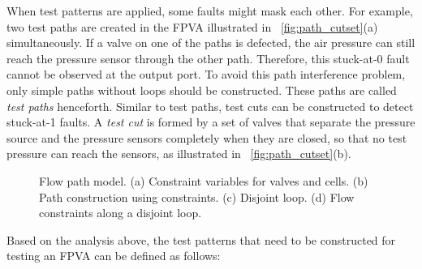 When test patterns are applied, some faults might mask each other. For
example, two test paths are created in the FPVA illustrated in
\figname~\ref{fig:path_cutset}(a) simultaneously. If a valve on one of the paths is defected, the
air pressure can still reach the pressure sensor through the other path.
Therefore, this stuck-at-0 fault cannot be observed at the output port.
To avoid this path interference problem, only simple paths without loops should
be constructed. These paths are called \textit{test paths} henceforth.
%
Similar to test paths,
test cuts can be constructed to detect stuck-at-1 faults. 
A \textit{test cut}
is formed by a set of valves that separate the pressure source and the pressure
sensors completely when they are closed, so that no test pressure can reach
the sensors, as illustrated in \figname~\ref{fig:path_cutset}(b).

%

\begin{figure*}[t]
{\figurefontsize
\centering

\caption{Flow path model. (a) Constraint variables for valves and cells. (b) Path construction using constraints. (c) Disjoint loop. (d) Flow constraints along a disjoint loop.}
\label{fig:flow_path_model}
}
\end{figure*}

Based on the analysis above, the test patterns that need to be constructed for
testing an FPVA can be defined as follows:

